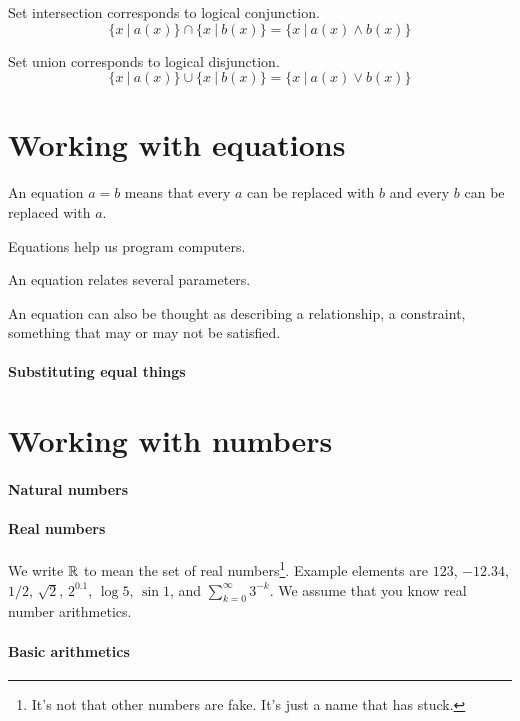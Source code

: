 Set intersection corresponds to logical conjunction.
\[
\{ x ~|~ a(x) \} \cap \{ x ~|~ b(x) \} = \{ x ~|~ a(x) \wedge b(x) \}
\]

Set union corresponds to logical disjunction.
\[
\{ x ~|~ a(x) \} \cup \{ x ~|~ b(x) \} = \{ x ~|~ a(x) \vee b(x) \}
\]

\section{Working with equations}

An equation \(a = b\) means that every \(a\) can be replaced with \(b\)
and every \(b\) can be replaced with \(a\).

Equations help us program computers.

An equation relates several parameters.

An equation can also be thought as describing a relationship, a constraint, something that may or may not be satisfied.

\paragraph{Substituting equal things}

\section{Working with numbers}

\paragraph{Natural numbers}

\paragraph{Real numbers}

%
We write \( \mathbb{R} \) to mean the set of real numbers\footnote{%
It's not that other numbers are fake. It's just a name that has stuck.%
}.
Example elements are \( 123 \), \( -12.34 \), \( 1/2 \),
\( \sqrt{2} \), \( 2^{0.1} \), \( \log 5 \), \( \sin 1 \), and \( \sum_{k=0}^\infty 3^{-k} \).
We assume that you know real number arithmetics.

\paragraph{Basic arithmetics}

